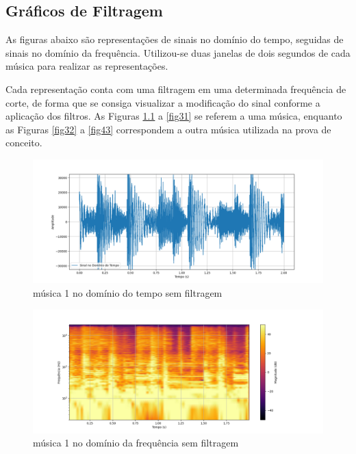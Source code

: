 \begin{anexosenv}

\partanexos

\chapter{Gráficos de Filtragem}
\label{anexos:filtragem}

As figuras abaixo são representações de sinais no domínio do tempo, seguidas de sinais no domínio da frequência. Utilizou-se duas janelas de dois segundos de cada música para realizar as representações. 

Cada representação conta com uma filtragem em uma determinada frequência de corte, de forma que se consiga visualizar a modificação do sinal conforme a aplicação dos filtros. As Figuras \ref{fig40} a \ref{fig31} se referem a uma música, enquanto as Figuras \ref{fig32} a \ref{fig43} correspondem a outra música utilizada na prova de conceito.
 
\begin{figure}[h]
	\centering
    \includegraphics[width=\textwidth]{figuras/fig40.png}
	\caption{música 1 no domínio do tempo sem filtragem}
	\label{fig40}
\end{figure}

\begin{figure}[h]
	\centering
    \includegraphics[width=\textwidth]{figuras/fig41.png}
	\caption{música 1 no domínio da frequência sem filtragem}
	\label{fig41}
\end{figure}


\end{anexosenv}
